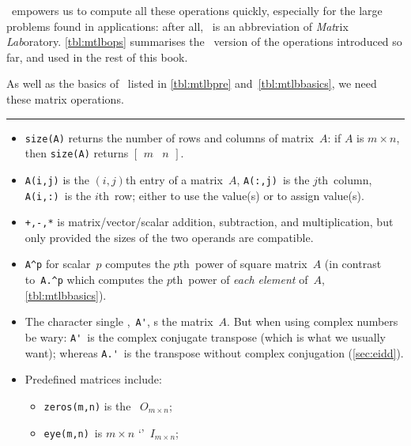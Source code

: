 \script\ empowers us to compute all these operations quickly, especially for the large problems found in applications: after all, \script[1]\ is an abbreviation of \emph{Mat}rix \emph{Lab}oratory.
\autoref{tbl:mtlbops} summarises the \script\ version of the operations introduced so far, and used in the rest of this book.

\begin{table}
\caption{As well as the basics of \script\ listed in \autoref{tbl:mtlbpre} and~\ref{tbl:mtlbbasics},  we need these matrix operations.} \label{tbl:mtlbops}
\hrule
\begin{minipage}{\linewidth}
\begin{itemize}
\item {}\verb|size(A)| returns the number of rows and columns of matrix~\(A\): if \(A\) is \(m\times n\), then \verb|size(A)| returns \(\begin{bmatrix} m&n \end{bmatrix}\).
\item \verb|A(i,j)| is the \((i,j)\)th entry of a matrix~\(A\), \verb|A(:,j)|~is the \(j\)th~column, \verb|A(i,:)|~is the \(i\)th~row; either to use the value(s) or to assign value(s).
\item {}\verb|+,-,*| is matrix\slash vector\slash scalar addition, subtraction, and multiplication, but only provided the sizes of the two operands are compatible.
\item \verb|A^p| for scalar~\(p\) computes the \(p\)th~power of square matrix~\(A\) (in contrast to~\verb|A.^p| which  computes the \(p\)th~power of \emph{each element} of~\(A\), \autoref{tbl:mtlbbasics}).
\item The character single ,~\verb|A'|, s the matrix~\(A\).  
But when using complex numbers be wary: \verb|A'|~is the complex conjugate transpose (which is what we usually want); whereas \verb|A.'|~is the transpose without complex conjugation (\autoref{sec:eidd}).
\item Predefined matrices include:
\begin{itemize}
\item {}\verb|zeros(m,n)| is the ~\(O_{m\times n}\);
\item {}\verb|eye(m,n)|~is \(m\times n\) `'~\(I_{m\times n}\);

\end{itemize}
\end{itemize}
\end{minipage}
\end{table}
